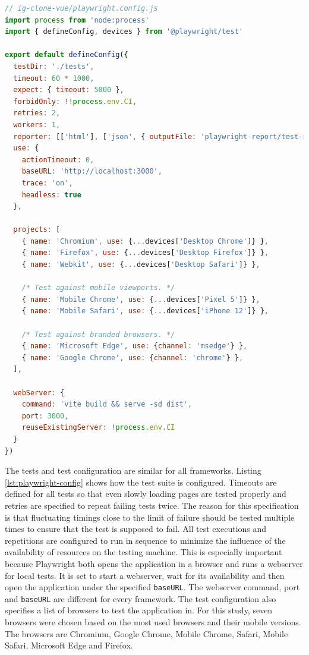 \documentclass[a4paper, 10pt]{article}
\begin{document}
\begin{lstlisting}[caption={Playwright configuration for Vue.js}, label={lst:playwright-config}, language=JavaScript]
// ig-clone-vue/playwright.config.js
import process from 'node:process'
import { defineConfig, devices } from '@playwright/test'

export default defineConfig({
  testDir: './tests',
  timeout: 60 * 1000,
  expect: { timeout: 5000 },
  forbidOnly: !!process.env.CI,
  retries: 2,
  workers: 1,
  reporter: [['html'], ['json', { outputFile: 'playwright-report/test-results.json' }]],
  use: {
    actionTimeout: 0,
    baseURL: 'http://localhost:3000',
    trace: 'on',
    headless: true
  },

  projects: [
    { name: 'Chromium', use: {...devices['Desktop Chrome']} },
    { name: 'Firefox', use: {...devices['Desktop Firefox']} },
    { name: 'Webkit', use: {...devices['Desktop Safari']} },

    /* Test against mobile viewports. */
    { name: 'Mobile Chrome', use: {...devices['Pixel 5']} },
    { name: 'Mobile Safari', use: {...devices['iPhone 12']} },

    /* Test against branded browsers. */
    { name: 'Microsoft Edge', use: {channel: 'msedge'} },
    { name: 'Google Chrome', use: {channel: 'chrome'} },
  ],

  webServer: {
    command: 'vite build && serve -sd dist',
    port: 3000,
    reuseExistingServer: !process.env.CI
  }
})

\end{lstlisting}

The tests and test configuration are similar for all frameworks.
Listing \ref{lst:playwright-config} shows how the test suite is configured.
Timeouts are defined for all tests so that even slowly loading pages are tested properly and retries are specified to repeat failing tests twice.
The reason for this specification is that fluctuating timings close to the limit of failure should be tested multiple times to ensure that the test is supposed to fail.
All test executions and repetitions are configured to run in sequence to minimize the influence of the availability of resources on the testing machine.
This is especially important because Playwright both opens the application in a browser and runs a webserver for local tests.
It is set to start a webserver, wait for its availability and then open the application under the specified \verb|baseURL|.
The webserver command, port and \verb|baseURL| are different for every framework.
The test configuration also specifies a list of browsers to test the application in.
For this study, seven browsers were chosen based on the most used browsers \citep{browserUsage} and their mobile versions.
The browsers are Chromium, Google Chrome, Mobile Chrome, Safari, Mobile Safari, Microsoft Edge and Firefox.
\end{document}
